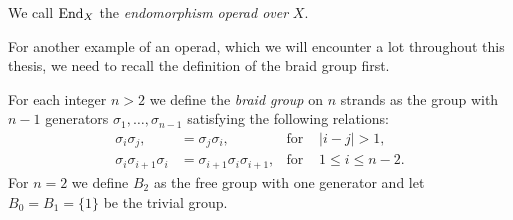 \begin{egs}
\begin{enumerate}
            \begin{center}
            \end{center}
        
            We call $\operatorname{End}_X$ the {\em endomorphism operad over} $X$.

        \end{enumerate}
    \end{egs}

    For another example of an operad, which we will encounter a lot throughout
    this thesis, we need to recall the definition of the braid group first.

    \begin{defin}
        For each integer $n > 2$ we define the {\em braid group} on $n$ strands
        as the group with $n-1$ generators $\sigma_1, \dots ,\sigma_{n-1}$
        satisfying the following relations:
        \begin{align*}
            \sigma_i \sigma_j, & = \sigma_j \sigma_i, & \text{for } &|i-j|>1,\\
            \sigma_i \sigma_{i+1} \sigma_i & = \sigma_{i+1} \sigma_i \sigma_{i+1}, & \text{for } &1 \leq i \leq n-2.
        \end{align*}
        For $n=2$ we define $B_2$ as the free group with one generator and let
        $B_0 = B_1 = \{1\}$ be the trivial group.
    \end{defin}

